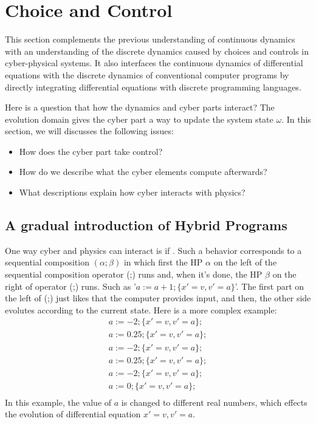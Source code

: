 \section{Choice and Control}

This section complements the previous understanding of continuous dynamics with an understanding of the discrete dynamics caused by choices and controls in cyber-physical systems.
It also interfaces the continuous dynamics of differential equations with the discrete dynamics of conventional computer programs by directly integrating differential equations with discrete programming languages.

Here is a question that how the dynamics and cyber parts interact?
The evolution domain gives the cyber part a way to update the system state $\omega$.
In this section, we will discusses the following issues:
\begin{itemize}
  \item How does the cyber part take control?
  \item How do we describe what the cyber elements compute afterwards?
  \item What descriptions explain how cyber interacts with physics?
\end{itemize}

\subsection{A gradual introduction of Hybrid Programs}

One way cyber and physics can interact is if .
Such a behavior corresponds to a sequential composition $(\alpha ; \beta)$ in which first the HP $\alpha$ on the left of the sequential composition operator (;) runs and, when it's done, the HP $\beta$ on the right of operator (;) runs.
Such as '$a:=a+1;\{x'=v, v'=a\}$'. The first part on the left of (;) just likes that the computer provides input, and then, the other side evolutes according to the current state.
Here is a more complex example:
\begin{align*}
  a := -2; \{x' = v, v' = a\}; \\
  a := 0.25; \{x' = v, v' = a\}; \\
  a := -2; \{x' = v, v' = a\}; \\
  a := 0.25; \{x' = v, v' = a\}; \\
  a := -2; \{x' = v, v' = a\}; \\
  a := 0; \{x' = v, v' = a\}; \\
\end{align*}
In this example, the value of $a$ is changed to different real numbers, 
which effects the evolution of differential equation $x' = v, v' = a$.

